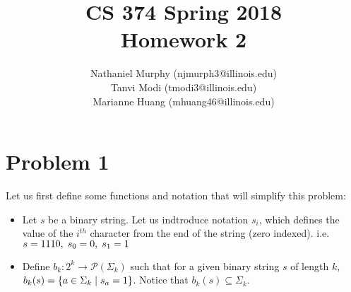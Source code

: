\documentclass[11pt]{article}
\title{\textbf{CS 374 Spring 2018\\Homework 2}}
\author{Nathaniel Murphy (njmurph3@illinois.edu)\\
		Tanvi Modi (tmodi3@illinois.edu)\\
		Marianne Huang (mhuang46@illinois.edu)}
\date{}
\begin{document}
\maketitle
\section*{Problem 1}
Let us first define some functions and notation that will simplify this problem:
\begin{itemize}
	\item Let $s$ be a binary string. Let us indtroduce notation $s_i$, which defines the value of the $i^{th}$ character from the end of the string (zero indexed). i.e. $s=1110,\hspace{1mm}s_0=0,\hspace{1mm}s_1=1$
	\item Define $b_k:2^k\rightarrow\mathcal{P}(\Sigma_k)$ such that for a given binary string $s$ of length $k$,\\$b_k(s)=\{a\in\Sigma_k\hspace{1mm}|\hspace{1mm}s_a=1\}$. Notice that $b_k(s)\subseteq\Sigma_k$.
\end{itemize}
\end{document}
